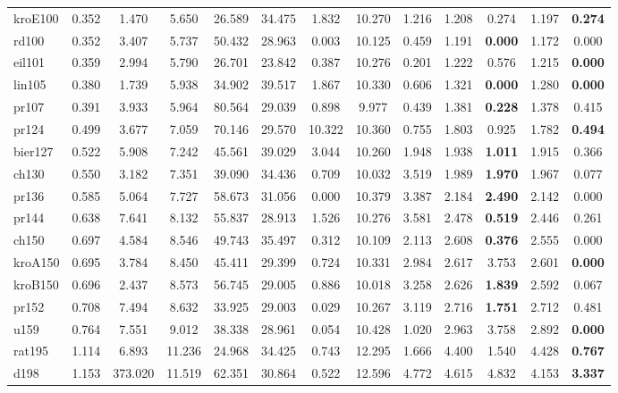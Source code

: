 \begin{table}[t]
{\begin{tabular}{lcccccccccccc}
kroE100   & 0.352 & 1.470 & 5.650 & 26.589 & 34.475 & 1.832 & 10.270 & 1.216 & 1.208 & 0.274 & 1.197 & \textbf{0.274} \\
rd100     & 0.352 & 3.407 & 5.737 & 50.432 & 28.963 & 0.003 & 10.125 & 0.459 & 1.191 & \textbf{0.000} & 1.172 & 0.000 \\
eil101    & 0.359 & 2.994 & 5.790 & 26.701 & 23.842 & 0.387 & 10.276 & 0.201 & 1.222 & 0.576 & 1.215 & \textbf{0.000} \\
lin105    & 0.380 & 1.739 & 5.938 & 34.902 & 39.517 & 1.867 & 10.330 & 0.606 & 1.321 & \textbf{0.000} & 1.280 & \textbf{0.000} \\
pr107     & 0.391 & 3.933 & 5.964 & 80.564 & 29.039 & 0.898 & 9.977 & 0.439 & 1.381 & \textbf{0.228} & 1.378 & 0.415 \\
pr124     & 0.499 & 3.677 & 7.059 & 70.146 & 29.570 & 10.322 & 10.360 & 0.755 & 1.803 & 0.925 & 1.782 & \textbf{0.494} \\
bier127   & 0.522 & 5.908 & 7.242 & 45.561 & 39.029 & 3.044 & 10.260 & 1.948 & 1.938 & \textbf{1.011} & 1.915 & 0.366 \\
ch130     & 0.550 & 3.182 & 7.351 & 39.090 & 34.436 & 0.709 & 10.032 & 3.519 & 1.989 & \textbf{1.970} & 1.967 & 0.077 \\
pr136     & 0.585 & 5.064 & 7.727 & 58.673 & 31.056 & 0.000 & 10.379 & 3.387 & 2.184 & \textbf{2.490} & 2.142 & 0.000 \\
pr144     & 0.638 & 7.641 & 8.132 & 55.837 & 28.913 & 1.526 & 10.276 & 3.581 & 2.478 & \textbf{0.519} & 2.446 & 0.261 \\
ch150     & 0.697 & 4.584 & 8.546 & 49.743 & 35.497 & 0.312 & 10.109 & 2.113 & 2.608 & \textbf{0.376} & 2.555 & 0.000 \\
kroA150   & 0.695 & 3.784 & 8.450 & 45.411 & 29.399 & 0.724 & 10.331 & 2.984 & 2.617 & 3.753 & 2.601 & \textbf{0.000} \\
kroB150   & 0.696 & 2.437 & 8.573 & 56.745 & 29.005 & 0.886 & 10.018 & 3.258 & 2.626 & \textbf{1.839} & 2.592 & 0.067 \\
pr152     & 0.708 & 7.494 & 8.632 & 33.925 & 29.003 & 0.029 & 10.267 & 3.119 & 2.716 & \textbf{1.751} & 2.712 & 0.481 \\
u159      & 0.764 & 7.551 & 9.012 & 38.338 & 28.961 & 0.054 & 10.428 & 1.020 & 2.963 & 3.758 & 2.892 & \textbf{0.000} \\
rat195    & 1.114 & 6.893 & 11.236 & 24.968 & 34.425 & 0.743 & 12.295 & 1.666 & 4.400 & 1.540 & 4.428 & \textbf{0.767} \\
d198      & 1.153 & 373.020 & 11.519 & 62.351 & 30.864 & 0.522 & 12.596 & 4.772 & 4.615 & 4.832 & 4.153 & \textbf{3.337} \\

\end{tabular}}
\end{table}
